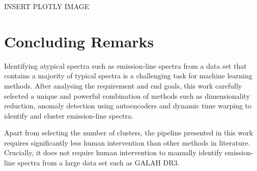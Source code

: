 INSERT PLOTLY IMAGE

\section{Concluding Remarks}

Identifying atypical spectra such as emission-line spectra from a data set that contains a majority of typical spectra is a challenging task for machine learning methods. After analysing the requirement and end goals, this work carefully selected a unique and powerful combination of methods such as dimensionality reduction, anomaly detection using autoencoders and dynamic time warping to identify and cluster emission-line spectra. 

Apart from selecting the number of clusters, the pipeline presented in this work requires significantly less human intervention than other methods in literature. Crucially, it does not require human intervention to manually identify emission-line spectra from a large data set such as GALAH DR3. 







